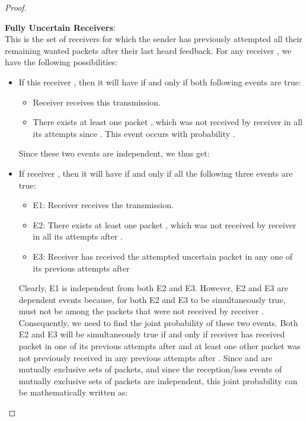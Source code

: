 \documentclass[10pt,jounral]{IEEEtran}
\newcommand{\ignore}[1]{}
\begin{document}
\begin{proof}
\begin{itemize}
\ignore{where  is referred to as the innovation probability of packet  at receiver , defined as the probability that packet  was not previously received by this receiver in any previous attempts since .}
\end{itemize}
\textbf{Fully Uncertain Receivers}: \\
\ignore{As defined earlier,} This is the set of receivers for which the sender has previously attempted all their remaining wanted packets after their last heard feedback.
For any receiver , we have the following possibilities:
\begin{singlecol}
\begin{itemize}
\item If this receiver , then it will have  if and only if both following events are true:
    \begin{itemize}
    \item Receiver  receives this transmission.
     \item There exists at least one packet , which was not received by receiver  in all its attempts since . This event occurs with probability .
     \end{itemize}
     Since these two events are independent, we thus get:

\ignore{where  is referred to as the completion probability of receiver , defined as the probability that receiver  has completed the reception of all its wanted packets in previous attempts from the sender.}
\item If receiver , then it will have   if and only if all the following three events are true:
   \begin{itemize}
   \item E1: Receiver  receives the transmission.
   \item E2: There exists at least one packet , which was not received by receiver  in all its attempts after .
   \item E3: Receiver  has received the attempted uncertain packet  in any one of its previous attempts after 
   \end{itemize}
   Clearly, E1 is independent from both E2 and E3. However, E2 and E3 are dependent events because, for both E2 and E3 to be simultaneously true,  must not be among the packets that were not received by receiver \ignore{ for E2 to be true}. Consequently, we need to find the joint probability of these two events. Both E2 and E3 will be simultaneously true if and only if receiver  has received packet  in one of its previous attempts after  and at least one other packet  was not previously received in any previous attempts after . Since  and  are mutually exclusive sets of packets, and since the reception/loss events of mutually exclusive sets of packets are independent, this joint probability can be mathematically written as:
   

\end{itemize}
\end{singlecol}
\end{proof}
\end{document}

